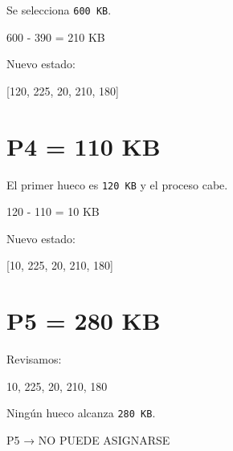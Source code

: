 \documentclass[
  spanish,
  letterpaper,
]{scrbook}
\newenvironment{Shaded}{\begin{snugshade}}{\end{snugshade}}
\newcommand{\NormalTok}[1]{\textcolor[rgb]{0.00,0.23,0.31}{#1}}
\begin{document}
Se selecciona \texttt{600\ KB}.

\begin{Shaded}
\begin{Highlighting}[]
\NormalTok{600 {-} 390 = 210 KB}
\end{Highlighting}
\end{Shaded}

Nuevo estado:

\begin{Shaded}
\begin{Highlighting}[]
\NormalTok{[120, 225, 20, 210, 180]}
\end{Highlighting}
\end{Shaded}

\section{P4 = 110 KB}\label{p4-110-kb}

El primer hueco es \texttt{120\ KB} y el proceso cabe.

\begin{Shaded}
\begin{Highlighting}[]
\NormalTok{120 {-} 110 = 10 KB}
\end{Highlighting}
\end{Shaded}

Nuevo estado:

\begin{Shaded}
\begin{Highlighting}[]
\NormalTok{[10, 225, 20, 210, 180]}
\end{Highlighting}
\end{Shaded}

\section{P5 = 280 KB}\label{p5-280-kb}

Revisamos:

\begin{Shaded}
\begin{Highlighting}[]
\NormalTok{10, 225, 20, 210, 180}
\end{Highlighting}
\end{Shaded}

Ningún hueco alcanza \texttt{280\ KB}.

\begin{Shaded}
\begin{Highlighting}[]
\NormalTok{P5 → NO PUEDE ASIGNARSE}
\end{Highlighting}
\end{Shaded}
\end{document}
